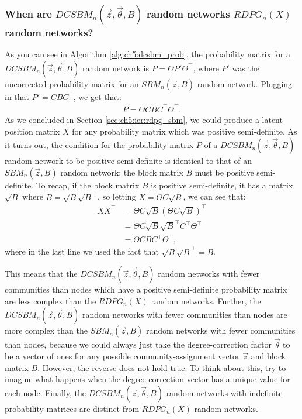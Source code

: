 \subsubsection{When are $DCSBM_n(\vec z, \vec \theta, B)$ random networks $RDPG_n(X)$ random networks?}
\label{sec:ch5:dcsbm:rdpg}
As you can see in Algorithm \ref{alg:ch5:dcsbm_prob}, the probability matrix for a $DCSBM_n(\vec z, \vec \theta, B)$ random network is $P = \Theta P' \Theta^\top$, where $P'$ was the uncorrected probability matrix for an $SBM_n(\vec z, B)$ random network. Plugging in that $P' = CBC^\top$, we get that:
\begin{align*}
    P = \Theta C B C^\top \Theta^\top.
\end{align*}
As we concluded in Section \ref{sec:ch5:ier:rdpg_sbm}, we could produce a latent position matrix $X$ for any probability matrix which was positive semi-definite. As it turns out, the condition for the probability matrix $P$ of a $DCSBM_n(\vec z, \vec \theta, B)$ random network to be positive semi-definite is {identical} to that of an $SBM_n(\vec z, B)$ random network: the block matrix $B$ must be positive semi-definite. To recap, if the block matrix $B$ is positive semi-definite, it has a matrix $\sqrt B$ where $B = \sqrt B \sqrt B^\top$, so letting $X = \Theta C \sqrt B$, we can see that:
\begin{align*}
    XX^\top &= \Theta C \sqrt B \left (\Theta C \sqrt B\right )^\top \\
    &= \Theta C \sqrt B \sqrt B^\top C^\top \Theta^\top \\
    &= \Theta C B C^\top \Theta^\top,
\end{align*}
where in the last line we used the fact that $\sqrt B\sqrt B^\top = B$. 

This means that the $DCSBM_n(\vec z, \vec \theta, B)$ random networks with fewer communities than nodes which have a positive semi-definite probability matrix are less complex than the $RDPG_n(X)$ random networks. Further, the $DCSBM_n(\vec z, \vec \theta, B)$ random networks with fewer communities than nodes are more complex than the $SBM_n(\vec z, B)$ random networks with fewer communities than nodes, because we could always just take the degree-correction factor $\vec \theta$ to be a vector of ones for any possible community-assignment vector $\vec z$ and block matrix $B$. However, the reverse does not hold true. To think about this, try to imagine what happens when the degree-correction vector has a unique value for each node. Finally, the $DCSBM_n(\vec z, \vec \theta, B)$ random networks with indefinite probability matrices are distinct from $RDPG_n(X)$ random networks.

